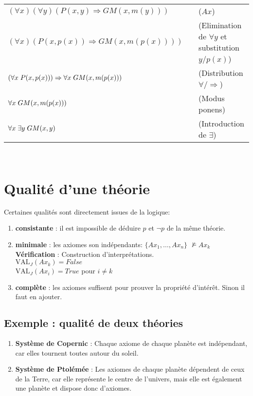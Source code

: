 \begin{tabular}{lll}
$(\forall x)(\forall y) \left(P(x,y)\Rightarrow GM(x, m(y)) \right)$&\hspace*{1cm}&($Ax$)\\
$(\forall x) \left(P(x,p(x))\Rightarrow GM(x, m(p(x))) \right)$&\hspace*{1cm}&(Elimination de $\forall y$ et substitution $y/p(x)$)\\
$\left( \forall x \hspace*{0.1cm} P(x,p(x)) \right)\Rightarrow \forall x \hspace*{0.1cm} GM(x,m(p(x)))$&\hspace*{1cm}&(Distribution $\forall/\Rightarrow$)\\
$\forall x \hspace*{0.1cm} GM(x,m(p(x)))$&\hspace*{1cm}&(Modus ponens)\\
$\forall x \hspace*{0.1cm} \exists y \hspace*{0.1cm} GM(x,y)$&\hspace*{1cm}&(Introduction de $\exists$)\\
\end{tabular}\\

\section{Qualité d'une théorie}
Certaines qualités sont directement issues de la logique:
\begin {enumerate}
\item {\textbf{consistante}} : il est impossible de déduire \(p\) et \(\neg p\)  de la même théorie.
\item {\textbf{minimale}} : les axiomes son indépendants: 
$\{Ax_1, \hdots, Ax_n\}$   $\nvDash Ax_k $\\
\textbf{Vérification} : Construction d'interprétations.\\
$\text{VAL}_J (Ax_k)= False$\\
$\text{VAL}_J (Ax_i)= True$  
pour $i \neq k$
\item {\textbf{complète}} : les axiomes suffisent pour prouver la propriété d'intérêt. Sinon il faut en ajouter.
\end {enumerate}
\subsection{Exemple : qualité de deux théories}
\begin {enumerate}
\item {\textbf{Système de Copernic}} : Chaque axiome de chaque planète est indépendant, car elles tournent toutes autour du soleil.
\item{\textbf{Système de Ptolémée}} : Les axiomes de chaque planète dépendent de ceux de la Terre, car elle représente le centre de l'univers, mais elle est également une planète et dispose donc d'axiomes.
\end {enumerate}
